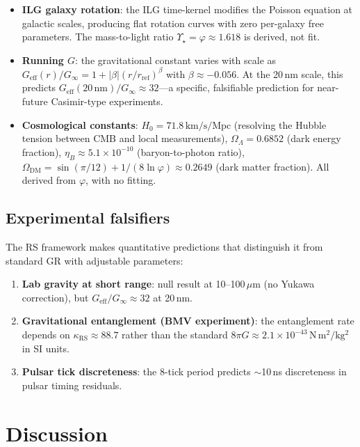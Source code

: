 \documentclass[11pt,a4paper]{article}
\newcommand{\vp}{\varphi}
\newcommand{\kRS}{\kappa_{\mathrm{RS}}}
\begin{document}
\begin{itemize}
\item \textbf{ILG galaxy rotation}: the ILG time-kernel modifies the Poisson equation at galactic scales, producing flat rotation curves with zero per-galaxy free parameters.
The mass-to-light ratio $\Upsilon_\star = \vp \approx 1.618$ is derived, not fit.
\item \textbf{Running $G$}: the gravitational constant varies with scale as $G_{\mathrm{eff}}(r)/G_\infty = 1 + |\beta|(r/r_{\mathrm{ref}})^\beta$ with $\beta \approx -0.056$.
At the 20\,nm scale, this predicts $G_{\mathrm{eff}}(20\,\mathrm{nm})/G_\infty \approx 32$---a specific, falsifiable prediction for near-future Casimir-type experiments.
\item \textbf{Cosmological constants}:
$H_0 = 71.8\,\mathrm{km/s/Mpc}$ (resolving the Hubble tension between CMB and local measurements),
$\Omega_\Lambda = 0.6852$ (dark energy fraction),
$\eta_B \approx 5.1 \times 10^{-10}$ (baryon-to-photon ratio),
$\Omega_{\mathrm{DM}} = \sin(\pi/12) + 1/(8\ln\vp) \approx 0.2649$ (dark matter fraction).
All derived from $\vp$, with no fitting.
\end{itemize}

\subsection{Experimental falsifiers}

The RS framework makes quantitative predictions that distinguish it from standard GR with adjustable parameters:
\begin{enumerate}
\item \textbf{Lab gravity at short range}: null result at 10--100\,$\mu$m (no Yukawa correction), but $G_{\mathrm{eff}}/G_\infty \approx 32$ at 20\,nm.
\item \textbf{Gravitational entanglement (BMV experiment)}: the entanglement rate depends on $\kRS \approx 88.7$ rather than the standard $8\pi G \approx 2.1 \times 10^{-43}\,\mathrm{N\,m^2/kg^2}$ in SI units.
\item \textbf{Pulsar tick discreteness}: the 8-tick period predicts $\sim$10\,ns discreteness in pulsar timing residuals.
\end{enumerate}

\section{Discussion}
\label{sec:discussion}
\end{document}
